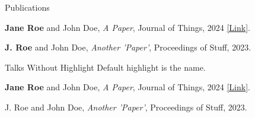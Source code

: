 \documentclass{resume}
\begin{document}
    \begin{rSection}{ Publications }
    \vspace{-1.1em}
        \item \textbf{Jane Roe} and John Doe, \emph{A Paper}, Journal of Things, 2024 \href{https://example.com/roe2024}{[Link]}.
    
        \item \textbf{J. Roe} and John Doe, \emph{Another 'Paper'}, Proceedings of Stuff, 2023.
    
    \end{rSection}

    \begin{rSection}{ Talks Without Highlight }
    Default highlight is the name.
        \item \textbf{Jane Roe} and John Doe, \emph{A Paper}, Journal of Things, 2024 \href{https://example.com/roe2024}{[Link]}.
    
        \item J. Roe and John Doe, \emph{Another 'Paper'}, Proceedings of Stuff, 2023.
    
    \end{rSection}
\end{document}
